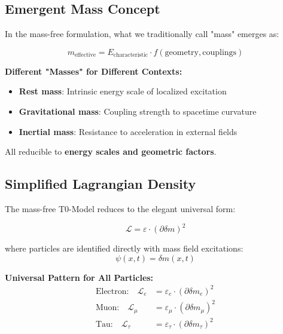 \documentclass[12pt,a4paper]{report}
\begin{document}
\subsection*{Emergent Mass Concept}

In the mass-free formulation, what we traditionally call "mass" emerges as:

\begin{equation}
	m_{\text{effective}} = E_{\text{characteristic}} \cdot f(\text{geometry}, \text{couplings})
\end{equation}

\textbf{Different "Masses" for Different Contexts:}
\begin{itemize}
	\item \textbf{Rest mass}: Intrinsic energy scale of localized excitation
	\item \textbf{Gravitational mass}: Coupling strength to spacetime curvature
	\item \textbf{Inertial mass}: Resistance to acceleration in external fields
\end{itemize}

All reducible to \textbf{energy scales and geometric factors}.

\subsection*{Simplified Lagrangian Density}

The mass-free T0-Model reduces to the elegant universal form:

\begin{equation}
	\boxed{\mathcal{L} = \varepsilon \cdot (\partial \delta m)^2}
\end{equation}

where particles are identified directly with mass field excitations:
\begin{equation}
	\psi(x,t) = \delta m(x,t)
\end{equation}

\textbf{Universal Pattern for All Particles:}
\begin{align}
	\text{Electron:} \quad \mathcal{L}_e &= \varepsilon_e \cdot (\partial \delta m_e)^2 \\
	\text{Muon:} \quad \mathcal{L}_\mu &= \varepsilon_\mu \cdot (\partial \delta m_\mu)^2 \\
	\text{Tau:} \quad \mathcal{L}_\tau &= \varepsilon_\tau \cdot (\partial \delta m_\tau)^2
\end{align}
\end{document}
